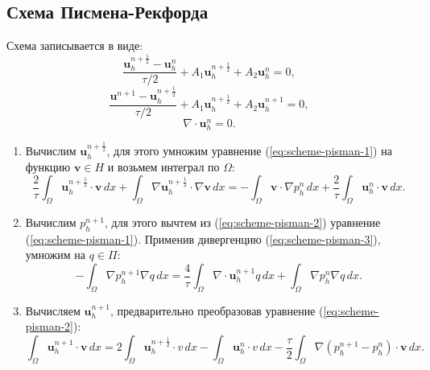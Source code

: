 \documentclass[12pt]{article}
\begin{document}
\subsection{Схема Писмена-Рекфорда} 
Схема записывается в виде:
\begin{equation} \label{eq:scheme-pisman-1}
\frac{{\bm u}_h^{n+\frac{1}{2}}-{\bm u}_h^n}{\tau/2} + A_1 {\bm u}_h^{n+\frac{1}{2}}+A_2 {\bm u}_h^n=0,
\end{equation}
\begin{equation} \label{eq:scheme-pisman-2}
\frac{{\bm u}^{n+1}-{\bm u}_h^{n+\frac{1}{2}}}{\tau/2} + A_1 {\bm u}_h^{n+\frac{1}{2}}+ A_2 {\bm u}_h^{n+1}=0,
\end{equation}
\begin{equation} \label{eq:scheme-pisman-3}
\nabla \cdot {\bm u}_h^n = 0.
\end{equation}
\begin{enumerate}
\item 
Вычислим ${\bm u}_h^{n+\frac{1}{2}}$, для этого умножим уравнение (\ref{eq:scheme-pisman-1}) на функцию ${\bm v} \in H$ и возьмем интеграл по $\Omega$:
$$
\frac{2}{\tau}\int_{\Omega} {\bm u}_h^{n+\frac{1}{2}}\cdot {\bm v} \,dx + \int_{\Omega} \nabla {\bm u}_h^{n+\frac{1}{2}} \cdot \nabla {\bm v} \,dx = -\int_{\Omega} {\bm v} \cdot \nabla p_h^{n}\, dx + \frac{2}{\tau} \int_{\Omega} {\bm u}_h^{n} \cdot {\bm v} \,dx.
$$
\item 
Вычислим $p_h^{n+1}$, для этого вычтем из (\ref{eq:scheme-pisman-2}) уравнение (\ref{eq:scheme-pisman-1}). Применив дивергенцию (\ref{eq:scheme-pisman-3}), умножим на $q \in \Pi$:
$$
-\int_{\Omega} \nabla p_h^{n+1} \nabla q \,dx = \frac{4}{\tau} \int_{\Omega} \nabla \cdot {\bm u}_h^{n+1} q \,dx + \int_{\Omega} \nabla p_h^{n} \nabla q \,dx.
$$
\item 
Вычисляем ${\bm u}_h^{n+1}$, предварительно преобразовав уравнение (\ref{eq:scheme-pisman-2}):
$$
\int_{\Omega} {\bm u}_h^{n+1} \cdot {\bm v}\,dx =  2 \int_{\Omega} {\bm u}_h^{n+\frac{1}{2}} \cdot v \,dx - \int_{\Omega} {\bm u}_h^n \cdot v \,dx - \frac{\tau}{2} \int_{\Omega} \nabla (p_h^{n+1} - p_h^n) \cdot {\bm v} \,dx.
$$
\end{enumerate}
\end{document}
